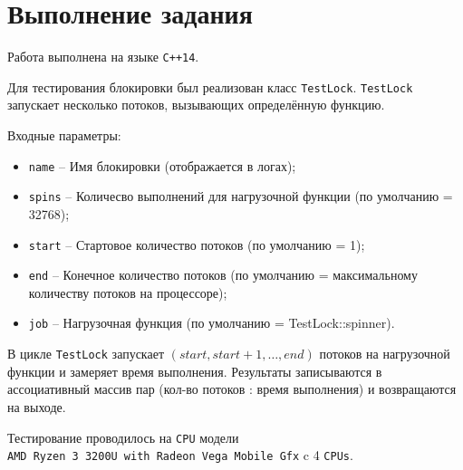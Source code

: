 \section{Выполнение задания}

Работа выполнена на языке \verb|C++14|.

Для тестирования блокировки был реализован класс \verb|TestLock|.
\verb|TestLock| запускает несколько потоков, вызывающих определённую функцию.

Входные параметры:

\begin{itemize}
    \item \verb|name| -- Имя блокировки (отображается в логах);
    \item \verb|spins| -- Количесво выполнений для нагрузочной функции (по умолчанию = 32768);
    \item \verb|start| -- Стартовое количество потоков (по умолчанию = 1);
    \item \verb|end| -- Конечное количество потоков (по умолчанию = максимальному количеству потоков на процессоре);
    \item \verb|job| -- Нагрузочная функция (по умолчанию = TestLock::spinner).
\end{itemize}

В цикле \verb|TestLock| запускает $ (start, start + 1, \dots, end) $ потоков
на нагрузочной функции и замеряет время выполнения. 
Результаты записываются в ассоциативный массив пар 
(кол-во потоков : время выполнения)
и возвращаются на выходе.

Тестирование проводилось на \verb|CPU| модели\\
\verb|AMD Ryzen 3 3200U with Radeon Vega Mobile Gfx|
c 4 \verb|CPUs|.

